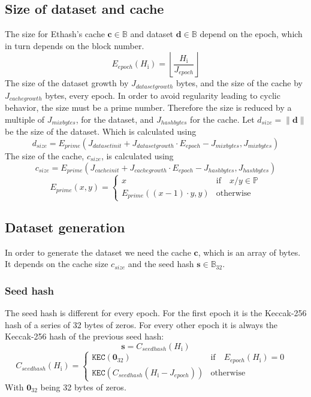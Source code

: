 \documentclass[9pt,oneside]{amsart}
\makeatletter
\newcommand{\linkdest}[1]{\Hy@raisedlink{\hypertarget{#1}{}}}
\makeatother
\begin{document}
\subsection{Size of dataset and cache}
The size for Ethash's cache $\mathbf{c} \in \mathbb{B}$  and dataset $\mathbf{d} \in \mathbb{B}$ depend on the epoch, which in turn depends on the block number.
\begin{equation}
 E_{epoch}(H_{\mathrm{i}}) = \left\lfloor\frac{H_{\mathrm{i}}}{J_{epoch}}\right\rfloor
\end{equation}
The size of the dataset growth by $J_{datasetgrowth}$ bytes, and the size of the cache by $J_{cachegrowth}$ bytes, every epoch. In order to avoid regularity leading to cyclic behavior, the size must be a prime number. Therefore the size is reduced by a multiple of $J_{mixbytes}$, for the dataset, and $J_{hashbytes}$ for the cache.
\linkdest{d__size}{}Let $d_{size} = \lVert \mathbf{d} \rVert$ be the size of the dataset. Which is calculated using
\begin{equation}
 d_{size} = E_{prime}(J_{datasetinit} + J_{datasetgrowth} \cdot E_{epoch} - J_{mixbytes}, J_{mixbytes})
\end{equation}
The size of the cache, $c_{size}$, is calculated using
\begin{equation}
 c_{size} = E_{prime}(J_{cacheinit} + J_{cachegrowth} \cdot E_{epoch} - J_{hashbytes}, J_{hashbytes})
\end{equation}
\begin{equation}
 E_{prime}(x, y) = \begin{cases}
x & \text{if} \quad x / y \in \mathbb{P} \\
E_{prime}((x - 1) \cdot y, y) & \text{otherwise}
\end{cases}
\end{equation}
\subsection{Dataset generation}
In order to generate the dataset we need the cache $\mathbf{c}$, which is an array of bytes. It depends on the cache size  $c_{size}$ and the seed hash $\mathbf{s} \in \mathbb{B}_{32}$.
\subsubsection{Seed hash}
The seed hash is different for every epoch. For the first epoch it is the Keccak-256 hash of a series of 32 bytes of zeros. For every other epoch it is always the Keccak-256 hash of the previous seed hash:
\begin{equation}
 \mathbf{s} = C_{seedhash}(H_{\mathrm{i}})
\end{equation}
\begin{equation}
 C_{seedhash}(H_{\mathrm{i}}) = \begin{cases}
\texttt{KEC}(\mathbf{0}_{32}) & \text{if} \quad E_{epoch}(H_{\mathrm{i}}) = 0 \quad  \\
\texttt{KEC}(C_{seedhash}(H_{\mathrm{i}} - J_{epoch})) & \text{otherwise}
\end{cases}
\end{equation}
With $\mathbf{0}_{32}$ being 32 bytes of zeros.
\end{document}
